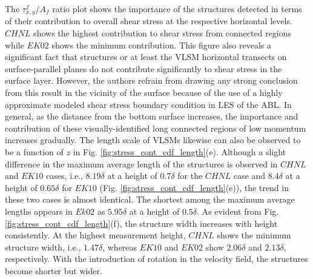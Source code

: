 The $\tau_{x,y}^f/A_f$ ratio plot shows the importance of the structures detected in terms of their contribution to overall shear stress at the respective horizontal levels.  $CHNL$  shows the highest  contribution to shear stress from  connected regions  while $EK02$ shows  the minimum contribution.  This figure also reveals a significant fact that structures or at least the VLSM horizontal transects on surface-parallel planes  do not contribute significantly to shear stress in the surface layer.  However, the authors refrain from drawing any strong conclusion from this result in the vicinity of the surface because of the use of a highly approximate modeled shear stress boundary condition in LES of the ABL.  In general, as the distance from the bottom surface increases, the importance and contribution of these visually-identified long connected regions of low momentum increases gradually. The length scale of VLSMs likewise can also be observed to be a function of $z$ in Fig. \ref{fig:stress_cont_cdf_length}(e). Although a slight difference in the maximum average  length of the structures is observed in $CHNL$ and $EK10$ cases, i.e., $8.19\delta$ at a height of $0.7\delta$ for the $CHNL$ case and $8.4\delta$ at a height of $0.65\delta$ for $EK10$ (Fig. \ref{fig:stress_cont_cdf_length}(e)), the trend in these two cases is almost identical. The shortest among the maximum average lengths appears in $Ek02$  as $5.95\delta$ at a height of $0.5\delta$.  As evident from Fig. \ref{fig:stress_cont_cdf_length}(f), the structure width increases with height consistently.  At the highest measurement height, $CHNL$  shows the minimum structure width, i.e., $1.47\delta$, whereas $EK10$ and $EK02$  show $2.06\delta$ and $2.13\delta$, respectively. With the introduction of rotation in the velocity field, the structures become shorter but wider. 

